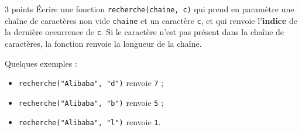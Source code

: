 \documentclass[a4paper,dvipsnames]{article}
\begin{document}
\medskip

\begin{exercice}{3 points}{}
  Écrire une fonction \texttt{recherche(chaine, c)} qui prend en paramètre une chaîne de caractères non vide \texttt{chaine} et un caractère \texttt{c}, et qui renvoie l'\textbf{indice} de la dernière occurrence de \texttt{c}. Si le caractère n'est pas présent dans la chaîne de caractères, la fonction renvoie la longueur de la chaîne.

  \tcblower

  Quelques exemples :

  \begin{itemize}
    \item \texttt{recherche("Alibaba", "d")} renvoie \texttt{7} ;
    \item \texttt{recherche("Alibaba", "b")} renvoie \texttt{5} ;
    \item \texttt{recherche("Alibaba", "l")} renvoie \texttt{1}.
  \end{itemize}
\end{exercice}
\end{document}
